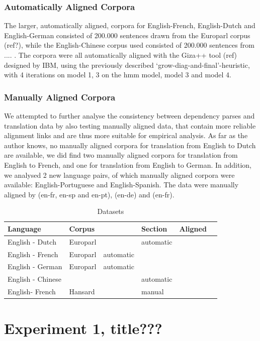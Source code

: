 \documentclass{report}
\theoremstyle{definition}
\theoremstyle{plain}
\begin{document}
\subsubsection{Automatically Aligned Corpora}
The larger, automatically aligned, corpora for English-French, English-Dutch and English-German consisted of 200.000 sentences drawn from the Europarl corpus (ref?), while the English-Chinese corpus used consisted of 200.000 sentences from .... . The corpora were all automatically aligned with the Giza++ tool (ref) designed by IBM, using the previously described `grow-diag-and-final'-heuristic, with 4 iterations on model 1, 3 on the hmm model, model 3 and model 4.


\subsubsection{Manually Aligned Corpora}
We attempted to further analyse the consistency between dependency parses and translation data by also testing manually aligned data, that contain more reliable alignment links and are thus more suitable for empirical analysis. As far as the author knows, no manually aligned corpora for translation from English to Dutch are available, we did find two manually aligned corpora for translation from English to French, and one for translation from English to German. In addition, we analysed  2 new language pairs, of which manually aligned corpora were available: English-Portuguese and English-Spanish. The data were manually aligned by \cite{graca2008building} (en-fr, en-sp and en-pt), \cite{pado2006optimal} (en-de) and \cite{och2000improved} (en-fr).

\begin{table}
\begin{tabular}{llllll}
Language & Corpus & & Section & Aligned\\
\hline
English - Dutch & Europarl & & automatic \\
English - French & Europarl & automatic \\
English - German & Europarl & automatic \\
English - Chinese & & & automatic \\
English- French & Hansard & & manual\\
\end{tabular}
\caption{Datasets}\label{tab:datasets}
\end{table}



\section{Experiment 1, title???}
\end{document}

